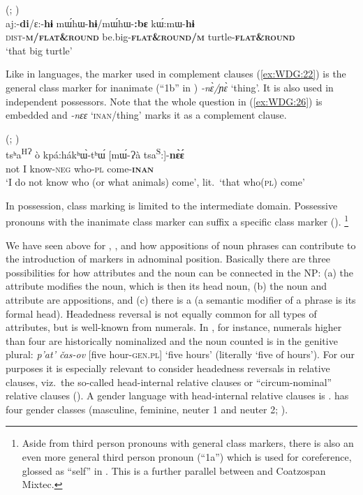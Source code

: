 \documentclass[output=collectionpaper]{langsci/langscibook}
\begin{document}
\ea\label{ex:WDG:25}
  (; \citealt[169]{Seifart2005})\\
\gll aj:-\textbf{di}/ɛ:-\textbf{hɨ}	mɯ́hɯ-\textbf{hɨ}/mɯ́hɯ-\textbf{:bɛ}	kɯ́:mɯ-\textbf{hɨ}\\
	\textsc{dist-\textbf{m/flat\&round}} 	be.big-\textbf{\textsc{flat\&round/m}}	turtle-\textbf{\textsc{flat\&round}}\\
\glt 	`that big turtle'\\
\z

Like in  languages, the marker used in complement clauses (\ref{ex:WDG:22}) is the general class marker for inanimate (``1b'' in ) \textit{-nɛ̀/ɲɛ̀} `thing'. It is also used in independent possessors. Note that the whole question in (\ref{ex:WDG:26}) is embedded and \textit{-nɛɛ} `\textsc{inan}/thing' marks it as a complement clause.

\ea\label{ex:WDG:26}
 (; \citealt[364]{Thiesen2012})\\
\gll tsʰa\textsuperscript{HɁ}	ò 	kpá:hákʰɯ̀-tʰɯ́	[mɯ́-Ɂà 	tsa\textsuperscript{S}:]-\textbf{nɛ̀ɛ́}\\
not	I	know-\textsc{neg}	who-\textsc{pl} 	come-\textbf{\textsc{inan}}\\
\glt	`I do not know who (or what animals) come', lit.\ `that who(\textsc{pl}) come'\\
\z

In possession, class marking is limited to the intermediate domain. Possessive pronouns with the inanimate class marker can suffix a specific class marker (\citealt[179]{Thiesen2012}).%
\footnote{%
Aside from third person pronouns with general class markers, there is also an even more general third person pronoun (``1a'') which is used for coreference, glossed as ``self'' in \cite[360]{Thiesen2012}. This is a further parallel between  and Coatzospan Mixtec.
} %

We have seen above for , , and  how appositions of noun phrases can contribute to the introduction of markers in adnominal position. Basically there are three possibilities for how attributes and the noun can be connected in the NP: (a) the attribute modifies the noun, which is then its head noun, (b) the noun and attribute are appositions, and (c) there is a  (a semantic modifier of a phrase is its formal head). Headedness reversal is not equally common for all types of attributes, but is well-known from numerals. In , for instance, numerals higher than four are historically nominalized and the noun counted is in the genitive plural: \textit{p'at' čas-ov} [five hour-\textsc{gen.pl}] `five hours' (literally `five of hours'). For our purposes it is especially relevant to consider headedness reversals in relative clauses, viz.\ the so-called head-internal relative clauses or ``circum-nominal'' relative clauses (\citealt[109--121]{Lehmann1984}). A gender language with head-internal relative clauses is .  has four gender classes (masculine, feminine, neuter 1 and neuter 2; ).
\end{document}
